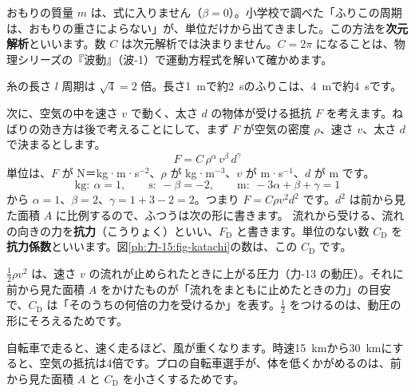 \noindent おもりの質量 $m$ は、式に入りません（$\beta =0$）。小学校で調べた「ふりこの周期は、おもりの重さによらない」が、単位だけから出てきました。この方法を\textbf{次元解析}といいます。数 $C$ は次元解析では決まりません。$C=2\pi$ になることは、物理シリーズの『波動』（波-1）で運動方程式を解いて確かめます。

\begin{phbaisuru}[4倍]{糸の長さ $l$}
周期は $\sqrt4=2$ 倍。長さ\qty{1}{m}で約\qty{2}{s}のふりこは、\qty{4}{m}で約\qty{4}{s}です。
\end{phbaisuru}

次に、空気の中を速さ $v$ で動く、太さ $d$ の物体が受ける抵抗 $F$ を考えます。ねばりの効き方は後で考えることにして、まず $F$ が空気の密度 $\rho$、速さ $v$、太さ $d$ で決まるとします。
\[F=C\,\rho^{\alpha }\,v^{\beta }\,d^{\gamma }\]
単位は、$F$ が N＝kg·m·s$^{-2}$、$\rho$ が kg·m$^{-3}$、$v$ が m·s$^{-1}$、$d$ が m です。
\[\text{kg}:\ \alpha =1,\qquad\text{s}:\ -\beta =-2,\qquad\text{m}:\ -3\alpha +\beta +\gamma =1\]
から $\alpha =1$、$\beta =2$、$\gamma =1+3-2=2$。つまり $F=C\rho v^2d^2$ です。$d^2$ は前から見た面積 $A$ に比例するので、ふつうは次の形に書きます。\label{ph:力-15:kouryoku}
\noindent 流れから受ける、流れの向きの力を\textbf{抗力}（こうりょく）といい、$F_{\mathrm D}$ と書きます。単位のない数 $C_{\mathrm D}$ を\textbf{抗力係数}といいます。図\ref{ph:力-15:fig-katachi}の数は、この $C_{\mathrm D}$ です。

\begin{phyomi}[$F_{\mathrm D}=\tfrac{1}{2}C_{\mathrm D}\rho Av^2$]
$\tfrac{1}{2}\rho v^2$ は、速さ $v$ の流れが止められたときに上がる圧力（力-13 の動圧）。それに前から見た面積 $A$ をかけたものが「流れをまともに止めたときの力」の目安で、$C_{\mathrm D}$ は「そのうちの何倍の力を受けるか」を表す。$\tfrac{1}{2}$ をつけるのは、動圧の形にそろえるためです。
\end{phyomi}

\begin{phmijika}[自転車と向かい風]
自転車で走ると、速く走るほど、風が重くなります。時速\qty{15}{km}から\qty{30}{km}にすると、空気の抵抗は4倍です。プロの自転車選手が、体を低くかがめるのは、前から見た面積 $A$ と $C_{\mathrm D}$ を小さくするためです。
\end{phmijika}

